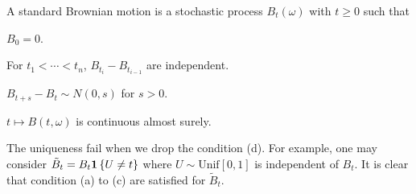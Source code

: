 \begin{definition}
    A standard Brownian motion is a stochastic process $B_t(\omega)$ with $t\geq 0$ 
    such that 
    \begin{thmenum}
        \item $B_0 = 0$. 
        \item For $t_1<\cdots<t_n$, $B_{t_i}-B_{t_{i-1}}$ are independent. 
        \item $B_{t+s}-B_t\sim N(0,s)$ for $s>0$. 
        \item $t\mapsto B(t,\omega)$ is continuous almost surely.
    \end{thmenum}
\end{definition}
\begin{remark}
    The uniqueness fail when we drop the condition (d). For example, 
    one may consider $\tilde{B}_t = B_t\mathbf{1}\left\{ {U\neq t} \right\}$ where $U\sim \text{Unif}[0,1]$ is 
    independent of $B_t$. It is clear that condition (a) to (c) are satisfied 
    for $\tilde{B}_t$. 
\end{remark}

